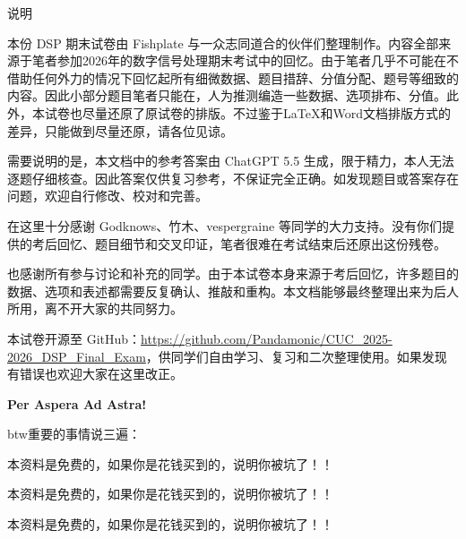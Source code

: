 \documentclass[UTF8,a4paper,12pt]{ctexart}
\begin{document}
\thispagestyle{empty}

\begin{center}
    {\heiti{} 说明}
\end{center}

\vspace{2em}

本份 DSP 期末试卷由 Fishplate 与一众志同道合的伙伴们整理制作。内容全部来源于笔者参加2026年的数字信号处理期末考试中的回忆。由于笔者几乎不可能在不借助任何外力的情况下回忆起所有细微数据、题目措辞、分值分配、题号等细致的内容。因此小部分题目笔者只能在\textbf{}，人为推测编造一些数据、选项排布、分值。此外，本试卷也尽量还原了原试卷的排版。不过鉴于\LaTeX{}和Word文档排版方式的差异，只能做到尽量还原，请各位见谅。

\vspace{1em}

需要说明的是，本文档中的参考答案由 ChatGPT 5.5 生成，限于精力，本人无法逐题仔细核查。因此答案仅供复习参考，不保证完全正确。如发现题目或答案存在问题，欢迎自行修改、校对和完善。

\vspace{1em}

在这里十分感谢 Godknows、竹木、vespergraine 等同学的大力支持。没有你们提供的考后回忆、题目细节和交叉印证，笔者很难在考试结束后还原出这份残卷。

\vspace{1em}

也感谢所有参与讨论和补充的同学。由于本试卷本身来源于考后回忆，许多题目的数据、选项和表述都需要反复确认、推敲和重构。本文档能够最终整理出来为后人所用，离不开大家的共同努力。


\begin{center}

{}

\end{center}


本试卷开源至 GitHub：\url{https://github.com/Pandamonic/CUC_2025-2026_DSP_Final_Exam}，供同学们自由学习、复习和二次整理使用。如果发现有错误也欢迎大家在这里改正。

\vspace{1em}


\begin{center}

{}

{\textbf{Per Aspera Ad Astra!}}

\vspace{1em}

{\heiti btw重要的事情说三遍：}

\vspace{1em}

{\heiti 本资料是免费的，如果你是花钱买到的，说明你被坑了！！}

{\heiti 本资料是免费的，如果你是花钱买到的，说明你被坑了！！}

{\heiti 本资料是免费的，如果你是花钱买到的，说明你被坑了！！}

\end{center}
\end{document}

